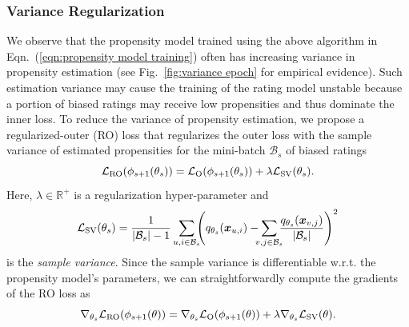 \documentclass[letterpaper]{article} %
\newcommand{\vectorize}[1]{\bm{#1}}
\newcommand{\lrdense}[2]{\smashoperator[lr]{#1_{#2}}}
\newcommand{\rdense}[2]{\smashoperator[r]{#1_{#2}}}
\newcommand{\realNumber}{\mathbb{R}}
\newcommand{\obsBiasedPairs}{\mathcal{B}}
\newcommand{\featureMark}{x}
\newcommand{\biasedFeatures}{\vectorize{\featureMark}_{u,i}}
\newcommand{\unbiasedFeatures}{\vectorize{\featureMark}_{v,j}}
\newcommand{\loss}[1]{\mathcal{L}_{\rm #1}}
\newcommand{\outerMark}{O}
\newcommand{\varianceMark}{SV}
\newcommand{\rOuterMark}{RO}
\newcommand{\ratingParam}{\phi}
\newcommand{\propensityName}{q}
\newcommand{\propensityParam}{\theta}
\newcommand{\propensityModel}{\propensityName_\propensityParam(\biasedFeatures)}
\newcommand{\regularization}{\lambda}
\newcommand{\step}{s}
\begin{document}
\subsubsection{Variance Regularization}
We observe that the propensity model trained using the above algorithm in Eqn.~(\ref{eqn:propensity model training}) often has increasing variance in propensity estimation (see Fig.~\ref{fig:variance epoch} for empirical evidence).
Such estimation variance may cause the training of the rating model unstable because a portion of biased ratings may receive low propensities and thus dominate the inner loss.
To reduce the variance of propensity estimation, we propose a regularized-outer (RO) loss that regularizes the outer loss with the sample variance of estimated propensities for the mini-batch $\obsBiasedPairs_\step$ of biased ratings
\begin{equation*}
\loss{\rOuterMark}(\ratingParam_{\step+1}(\propensityParam_\step))
=\loss{\outerMark}(\ratingParam_{\step+1}(\propensityParam_\step))
+\regularization\loss{\varianceMark}(\propensityParam_\step).
\end{equation*}%
Here, $\regularization\in\realNumber^+$ is a regularization hyper-parameter and
\begin{equation*}
\loss{\varianceMark}(\propensityParam_\step)
=\frac{1}{|\obsBiasedPairs_\step|-1}
\rdense{\sum}{u,i\in\obsBiasedPairs_\step}\Bigg(
  \propensityName_{\propensityParam_\step}(\biasedFeatures)
  -\lrdense{\sum}{v,j\in\obsBiasedPairs_\step}
  \frac{\propensityName_{\propensityParam_\step}(\unbiasedFeatures)}{|\obsBiasedPairs_\step|}
\Bigg)^2
\end{equation*}%
is the \emph{sample variance}.
Since the sample variance is differentiable w.r.t. the propensity model's parameters, we can straightforwardly compute the gradients of the RO loss as
\begin{equation*}
\nabla_{\propensityParam_\step}
\loss{\rOuterMark}(\ratingParam_{\step+1}(\propensityParam))
=\nabla_{\propensityParam_\step}
\loss{\outerMark}(\ratingParam_{\step+1}(\propensityParam))
+\regularization\nabla_{\propensityParam_\step}
\loss{\varianceMark}(\propensityParam).
\end{equation*}%
\end{document}
